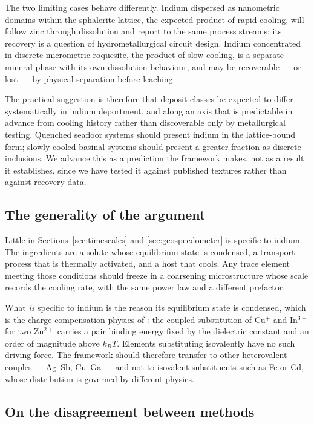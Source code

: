 \documentclass[preprint,12pt,authoryear]{elsarticle}
\begin{document}
The two limiting cases behave differently. Indium dispersed as nanometric
domains within the sphalerite lattice, the expected product of rapid cooling,
will follow zinc through dissolution and report to the same process streams;
its recovery is a question of hydrometallurgical circuit design. Indium
concentrated in discrete micrometric roquesite, the product of slow cooling,
is a separate mineral phase with its own dissolution behaviour, and may be
recoverable --- or lost --- by physical separation before leaching.

The practical suggestion is therefore that deposit classes be expected to
differ systematically in indium deportment, and along an axis that is
predictable in advance from cooling history rather than discoverable only by
metallurgical testing. Quenched seafloor systems should present indium in the
lattice-bound form; slowly cooled basinal systems should present a greater
fraction as discrete inclusions. We advance this as a prediction the framework
makes, not as a result it establishes, since we have tested it against
published textures rather than against recovery data.

\subsection{The generality of the argument}

Little in Sections~\ref{sec:timescales} and \ref{sec:geospeedometer} is specific
to indium. The ingredients are a solute whose equilibrium state is condensed, a
transport process that is thermally activated, and a host that cools. Any
trace element meeting those conditions should freeze in a coarsening
microstructure whose scale records the cooling rate, with the same power law and
a different prefactor.

What \emph{is} specific to indium is the reason its equilibrium state is
condensed, which is the charge-compensation physics of \citet{yu2026}: the
coupled substitution of Cu$^+$ and In$^{3+}$ for two Zn$^{2+}$ carries a pair
binding energy fixed by the dielectric constant and an order of magnitude above
$k_BT$. Elements substituting isovalently have no such driving force. The
framework should therefore transfer to other heterovalent couples --- Ag--Sb,
Cu--Ga --- and not to isovalent substituents such as Fe or Cd, whose
distribution is governed by different physics.

\subsection{On the disagreement between methods}
\end{document}
